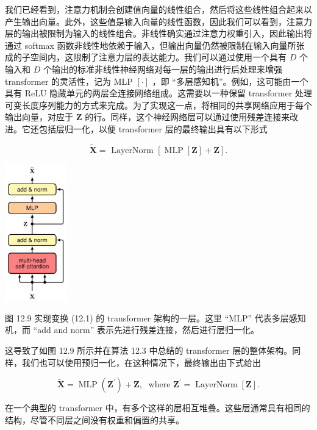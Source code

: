 \documentclass[10pt]{report}
\begin{document}
我们已经看到，注意力机制会创建值向量的线性组合，然后将这些线性组合起来以产生输出向量。此外，这些值是输入向量的线性函数，因此我们可以看到，注意力层的输出被限制为输入的线性组合。非线性确实通过注意力权重引入，因此输出将通过 softmax 函数非线性地依赖于输入，但输出向量仍然被限制在输入向量所张成的子空间内，这限制了注意力层的表达能力。我们可以通过使用一个具有 \(D\) 个输入和 \(D\) 个输出的标准非线性神经网络对每一层的输出进行后处理来增强 transformer 的灵活性，记为 MLP \(\left\lbrack  \cdot \right\rbrack\) ，即 “多层感知机”。例如，这可能由一个具有 ReLU 隐藏单元的两层全连接网络组成。这需要以一种保留 transformer 处理可变长度序列能力的方式来完成。为了实现这一点，将相同的共享网络应用于每个输出向量，对应于 \(\mathbf{Z}\) 的行。同样，这个神经网络层可以通过使用残差连接来改进。它还包括层归一化，以便 transformer 层的最终输出具有以下形式

\[
\widetilde{\mathbf{X}} = \text{ LayerNorm }\left\lbrack  {\operatorname{MLP}\left\lbrack  \mathbf{Z}\right\rbrack   + \mathbf{Z}}\right\rbrack  . \tag{12.22}
\]

\begin{center}
\includegraphics[max width=0.2\textwidth]{images/0194e279-9b28-703a-88f4-c3ac21e2010d_389_1102_358_286_637_0.jpg}
\end{center}
\hspace*{3em} 

图 12.9 实现变换 (12.1) 的 transformer 架构的一层。这里 “MLP” 代表多层感知机，而 “add and norm” 表示先进行残差连接，然后进行层归一化。

这导致了如图 12.9 所示并在算法 12.3 中总结的 transformer 层的整体架构。同样，我们也可以使用预归一化，在这种情况下，最终输出由下式给出

\[
\widetilde{\mathbf{X}} = \operatorname{MLP}\left( {\mathbf{Z}}^{\prime }\right)  + \mathbf{Z},\;\text{ where }{\mathbf{Z}}^{\prime } = \operatorname{LayerNorm}\left\lbrack  \mathbf{Z}\right\rbrack  . \tag{12.23}
\]

在一个典型的 transformer 中，有多个这样的层相互堆叠。这些层通常具有相同的结构，尽管不同层之间没有权重和偏置的共享。
\end{document}
